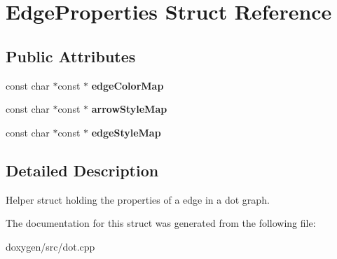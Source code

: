 \hypertarget{struct_edge_properties}{}\section{Edge\+Properties Struct Reference}
\label{struct_edge_properties}
\subsection*{Public Attributes}
\begin{DoxyCompactItemize}
\item 
\mbox{\label{struct_edge_properties_ad0c9d3fa5e49b41e92ff95cbf188a5b1}} 
const char $\ast$const  $\ast$ {\bfseries edge\+Color\+Map}
\item 
\mbox{\label{struct_edge_properties_a2b2315fe38a4822f4e657c71236fb027}} 
const char $\ast$const  $\ast$ {\bfseries arrow\+Style\+Map}
\item 
\mbox{\label{struct_edge_properties_a7938928bf27311c0e4acf2c40e0f0510}} 
const char $\ast$const  $\ast$ {\bfseries edge\+Style\+Map}
\end{DoxyCompactItemize}


\subsection{Detailed Description}
Helper struct holding the properties of a edge in a dot graph. 

The documentation for this struct was generated from the following file\+:\begin{DoxyCompactItemize}
\item 
doxygen/src/dot.\+cpp\end{DoxyCompactItemize}

